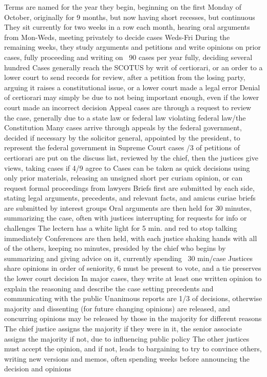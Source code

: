 \documentclass[11 pt, twoside]{article}
\newenvironment{outline*}
{
	\begin{outline}[enumerate]
	}
	{\end{outline}
}
\begin{document}
\begin{outline*}
\1 Terms are named for the year they begin, beginning on the first Monday of October, originally for 9 months, but now having short recesses, but continuous
\2 They sit currently for two weeks in a row each month, hearing oral arguments from Mon-Weds, meeting privately to decide cases Weds-Fri
\2 During the remaining weeks, they study arguments and petitions and write opinions on prior cases, fully proceeding and writing on ~90 cases per year fully, deciding several hundred
\1 Cases generally reach the SCOTUS by writ of certiorari, or an order to a lower court to send records for review, after a petition from the losing party, arguing it raises a constitutional issue, or a lower court made a legal error
\2 Denial of certiorari may simply be due to not being important enough, even if the lower court made an incorrect decision
\2 Appeal cases are through a request to review the case, generally due to a state law or federal law violating federal law/the Constitution
\2 Many cases arrive through appeals by the federal government, decided if necessary by the solicitor general, appointed by the president, to represent the federal government in Supreme Court cases
/3 of petitions of certiorari are put on the discuss list, reviewed by the chief, then the justices give views, taking cases if 4/9 agree to
\2 Cases can be taken as quick decisions using only prior materials, releasing an unsigned short per curiam opinion, or can request formal proceedings from lawyers
\1 Briefs first are submitted by each side, stating legal arguments, precedents, and relevant facts, and amicus curiae briefs are submitted by interest groups
\2 Oral arguments are then held for 30 minutes, summarizing the case, often with justices interrupting for requests for info or challenges
\2 The lectern has a white light for 5 min. and red to stop talking immediately
\2 Conferences are then held, with each justice shaking hands with all of the others, keeping no minutes, presided by the chief who begins by summarizing and giving advice on it, currently spending ~30 min/case
\2 Justices share opinions in order of seniority, 6 must be present to vote, and a tie preserves the lower court decision
\1 In major cases, they write at least one written opinion to explain the reasoning and describe the case setting precedents and communicating with the public
\2 Unanimous reports are 1/3 of decisions, otherwise majority and dissenting (for future changing opinions) are released, and concurring opinions may be released by those in the majority for different reasons
\2 The chief justice assigns the majority if they were in it, the senior associate assigns the majority if not, due to influencing public policy
\2 The other justices must accept the opinion, and if not, leads to bargaining to try to convince others, writing new versions and memos, often spending weeks before announcing the decision and opinions
\end{outline*}
\end{document}
